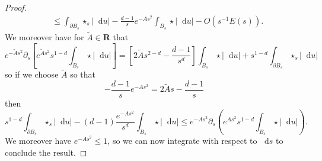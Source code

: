 \documentclass[reqno,12pt,letterpaper]{amsart}
\newcommand{\RR}{\mathbf{R}}
\newcommand*\dif{\mathop{}\!\mathrm{d}}
\theoremstyle{definition}
\numberwithin{equation}{section}
\begin{document}
\begin{proof}
\begin{align*}
&\leq \int_{\partial B_s} \star_s |\dif u| - \frac{d - 1}{s} e^{-As^2} \int_{B_s} \star |\dif u| - O(s^{-1}E(s)).
\end{align*}
We moreover have for $\tilde A \in \RR$ that
$$e^{-\tilde As^2} \partial_s \left[e^{\tilde As^2} s^{1 - d} \int_{B_s} \star |\dif u|\right] = \left[2\tilde As^{2 - d} - \frac{d - 1}{s^d}\right]\int_{B_s} \star |\dif u| + s^{1 - d} \int_{\partial B_s} \star_s |\dif u|$$
so if we choose $\tilde A$ so that
$$-\frac{d - 1}{s} e^{-As^2} = 2\tilde As - \frac{d - 1}{s}$$
then
$$s^{1 - d} \int_{\partial B_s} \star_s |\dif u| - (d - 1)\frac{e^{-As^2}}{s^d} \int_{B_s} \star|\dif u| \leq e^{-As^2} \partial_s\left(e^{As^2} s^{1 - d} \int_{B_s} \star|\dif u|\right).$$
We moreover have $e^{-As^2} \leq 1$, so we can now integrate with respect to $\dif s$ to conclude the result.
\end{proof}
\end{document}
